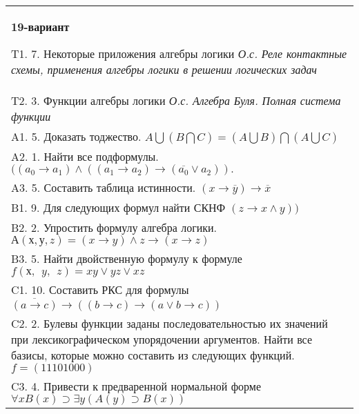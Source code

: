 \documentclass{article}
\begin{document}
\begin{tabular}{m{17cm}}
\textbf{19-вариант}
\newline

T1. 7. Некоторые приложения алгебры логики \emph{О.с. Реле контактные схемы, применения алгебры логики в решении логических задач} \\
T2. 3. Функции алгебры логики \emph{О.с. Алгебра Буля. Полная система функции} \\
A1. 5. Доказать тоджество. \(A\bigcup(B\bigcap C) = (A\bigcup B)\bigcap(A\bigcup C)\) \\
A2. 1. Найти все подформулы. \(((a_{0} \rightarrow a_{1}) \land ((a_{1} \rightarrow a_{2}) \rightarrow (\overline{a_{0}} \vee a_{2})).\) \\
A3. 5. Составить таблица истинности. \((x \rightarrow \overline{y}) \rightarrow \overline{x}\) \\
B1. 9. Для следующих формул найти СКНФ \((z \rightarrow x \land y))\) \\
B2. 2. Упростить формулу алгебра логики. \(А(х,у,z) = (x \rightarrow y) \land z \rightarrow (x \rightarrow z)\) \\
B3. 5. Найти двойственную формулу к формуле \(f(х,\ \ y,\ \ z) = xy \vee yz \vee xz\) \\
C1. 10. Составить РКС для формулы \(\overline{(a \rightarrow c)} \rightarrow \left( (b \rightarrow c) \rightarrow (a \vee b \rightarrow c) \right)\) \\
C2. 2. Булевы функции заданы последовательностью их значений при лексикографическом упорядочении аргументов. Найти все базисы, которые можно составить из следующих функций. \(f = (11101000)\) \\
C3. 4. Привести к предваренной нормальной форме \(\forall xB(x) \supset \exists y(A(y) \supset B(x))\) \\

\end{tabular}
\vspace{1cm}
\end{document}
